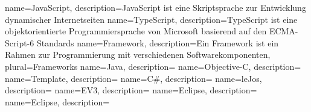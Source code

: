 
{
	name=JavaScript,
	description={JavaScript ist eine Skriptsprache zur Entwicklung dynamischer Internetseiten}
}
{
	name=TypeScript,
	description={TypeScript ist eine objektorientierte Programmiersprache von Microsoft basierend auf den ECMA-Script-6 Standards}
}
{
	name=Framework,
	description={Ein Framework ist ein Rahmen zur Programmierung mit verschiedenen Softwarekomponenten},
	plural=Frameworks
}
{
	name=Java,
	description={}
}
{
	name=Objective-C,
	description={}
}
{
	name=Template,
	description={}
}
{
	name=C\#,
	description={}
}
{
	name=leJos,
	description={}
}
{
	name=EV3,
	description={}
}
{
	name=Eclipse,
	description={}
}
{
	name=Eclipse,
	description={}
}


